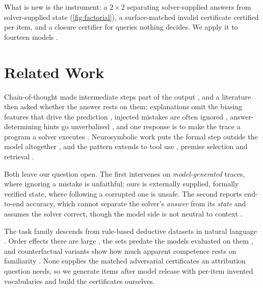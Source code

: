 \documentclass[10pt,twocolumn]{article}
\begin{document}
What is new is the instrument: a $2\times2$ separating solver-supplied answers
from solver-supplied state (\cref{fig:factorial}), a surface-matched invalid
certificate certified per item, and a closure certifier for queries nothing
decides. We apply it to fourteen models
\citep{team2024qwen,grattafiori2024llama,team2025gemma,microsoft2025phi,team2024olmo,allal2025smollm}.

\section{Related Work}

Chain-of-thought made intermediate steps part of the output
\citep{wei2022chainofthought}, and a literature then asked whether the answer
rests on them: explanations omit the biasing features that drive the prediction
\citep{turpin2023language}, injected mistakes are often ignored
\citep{lanham2023measuring,arcuschin2025chainofthought}, answer-determining
hints go unverbalised \citep{chen2025reasoning}, and one response is to make the
trace a program a solver executes \citep{lyu2023faithful}. Neurosymbolic work
puts the formal step outside the model altogether
\citep{pan2023logiclm,olausson2023linc,ye2023satlm,gao2022pal}, and the pattern
extends to tool use \citep{schick2023toolformer}, premise selection
\citep{yang2023leandojo} and retrieval \citep{lewis2020retrievalaugmented}.

Both leave our question open. The first intervenes on \emph{model-generated}
traces, where ignoring a mistake is unfaithful; ours is externally supplied,
formally verified state, where following a corrupted one is unsafe. The second
reports end-to-end accuracy, which cannot separate the solver's \emph{answer}
from its \emph{state} and assumes the solver correct, though the model side is
not neutral to context \citep{shi2023large,xie2023adaptive}.

The task family descends from rule-based deductive datasets in natural language
\citep{clark2020transformers,tafjord2020proofwriter,saparov2022language,han2022folio}.
Order effects there are large \citep{chen2024premise}, the sets predate the
models evaluated on them \citep{deng2024investigating,golchin2023time}, and
counterfactual variants show how much apparent competence rests on familiarity
\citep{wu2023reasoning}. None supplies the matched adversarial certificates an
attribution question needs, so we generate items after model release with
per-item invented vocabularies and build the certificates ourselves.
\end{document}
